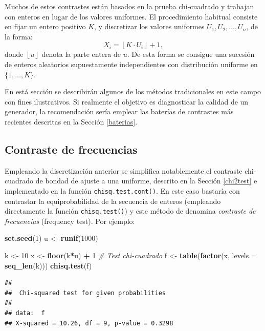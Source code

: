 \documentclass[
]{book}
\newenvironment{Shaded}{\begin{snugshade}}{\end{snugshade}}
\newcommand{\CommentTok}[1]{\textcolor[rgb]{0.56,0.35,0.01}{\textit{#1}}}
\newcommand{\DataTypeTok}[1]{\textcolor[rgb]{0.13,0.29,0.53}{#1}}
\newcommand{\DecValTok}[1]{\textcolor[rgb]{0.00,0.00,0.81}{#1}}
\newcommand{\KeywordTok}[1]{\textcolor[rgb]{0.13,0.29,0.53}{\textbf{#1}}}
\newcommand{\NormalTok}[1]{#1}
\newcommand{\OperatorTok}[1]{\textcolor[rgb]{0.81,0.36,0.00}{\textbf{#1}}}
\newcommand{\StringTok}[1]{\textcolor[rgb]{0.31,0.60,0.02}{#1}}
\theoremstyle{break}
\theoremstyle{definition}
\theoremstyle{definition}
\theoremstyle{definition}
\theoremstyle{remark}
\begin{document}
Muchos de estos contrastes están basados en la prueba chi-cuadrado y trabajan con enteros en lugar de los valores uniformes. El procedimiento habitual consiste en fijar un entero positivo \(K\), y discretizar los valores uniformes \(U_{1},U_{2},\ldots,U_{n}\), de la forma:
\[X_i = \left\lfloor K\cdot U_{i}\right\rfloor + 1 ,\]
donde \(\left\lfloor u\right\rfloor\) denota la parte entera de \(u\).
De esta forma se consigue una sucesión de enteros aleatorios supuestamente independientes con distribución uniforme en \(\{1, \ldots, K\}\).

En está sección se describirán algunos de los métodos tradicionales en este campo con fines ilustrativos. Si realmente el objetivo es diagnosticar la calidad de un generador, la recomendación sería emplear las baterías de contrastes más recientes descritas en la Sección \ref{baterias}.

\hypertarget{contraste-de-frecuencias}{%
\subsection{Contraste de frecuencias}\label{contraste-de-frecuencias}}

Empleando la discretización anterior se simplifica notablemente el contraste chi-cuadrado de bondad de ajuste a una uniforme, descrito en la Sección \ref{chi2test} e implementado en la función \texttt{chisq.test.cont()}.
En este caso bastaría con contrastar la equiprobabilidad de la secuencia de enteros (empleando directamente la función \texttt{chisq.test()}) y este método de denomina \emph{contraste de frecuencias} (frequency test).
Por ejemplo:

\begin{Shaded}
\begin{Highlighting}[]
\KeywordTok{set.seed}\NormalTok{(}\DecValTok{1}\NormalTok{)}
\NormalTok{u <-}\StringTok{ }\KeywordTok{runif}\NormalTok{(}\DecValTok{1000}\NormalTok{)}

\NormalTok{k <-}\StringTok{ }\DecValTok{10}
\NormalTok{x <-}\StringTok{ }\KeywordTok{floor}\NormalTok{(k}\OperatorTok{*}\NormalTok{u) }\OperatorTok{+}\StringTok{ }\DecValTok{1}
\CommentTok{# Test chi-cuadrado}
\NormalTok{f <-}\StringTok{ }\KeywordTok{table}\NormalTok{(}\KeywordTok{factor}\NormalTok{(x, }\DataTypeTok{levels =} \KeywordTok{seq_len}\NormalTok{(k)))}
\KeywordTok{chisq.test}\NormalTok{(f)}
\end{Highlighting}
\end{Shaded}

\begin{verbatim}
## 
##  Chi-squared test for given probabilities
## 
## data:  f
## X-squared = 10.26, df = 9, p-value = 0.3298
\end{verbatim}
\end{document}
